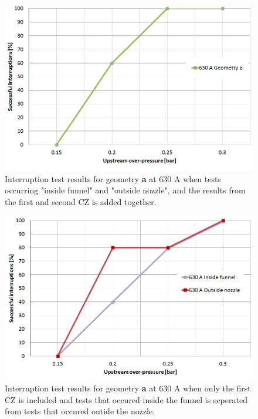 \documentclass[10pt,b5paper,twoside]{article}
\begin{document}
\begin{figure}[H]
\centering
\includegraphics[scale=0.45]{Bilder/Results/geoA630amp.png}
\caption{Interruption test results for geometry \textbf{a} at 630 A when tests occurring "inside funnel" and "outside nozzle", and the results from the first and second CZ is added together.} \label{fig:results630AgeoA}
\end{figure}

\begin{figure}[H]
\centering
\includegraphics[scale=0.45]{Bilder/Results/geoA630ampcomp.png}
\caption{Interruption test results for geometry \textbf{a} at 630 A when only the first CZ is included and tests that occured inside the funnel is seperated from tests that occured outide the nozzle.} \label{fig:results630AgeoAcomp}
\end{figure}
\end{document}
